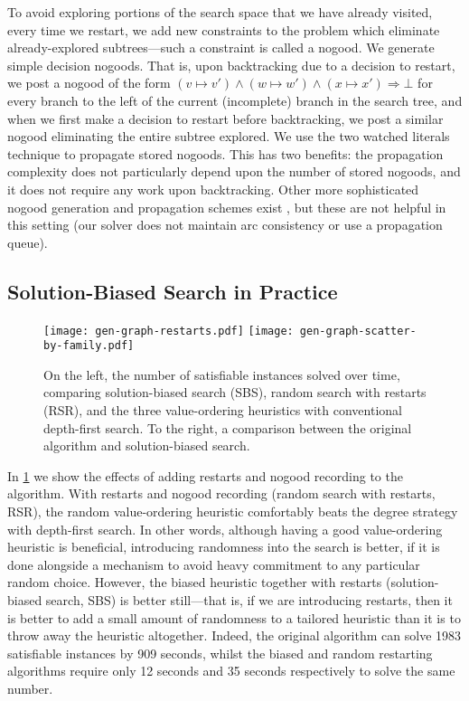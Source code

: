 \documentclass[runningheads]{llncs}
\newcommand{\siplineref}[1]{line~\ref{line:sip:#1}}
\begin{document}
To avoid exploring portions of the search
space that we have already visited, every time we restart, we add new constraints to the problem
which eliminate already-explored subtrees---such a constraint is called a nogood. We generate
simple decision nogoods. That is, upon backtracking due to a decision to restart, we post a nogood
of the form $(v \mapsto v') \wedge (w \mapsto w') \wedge (x \mapsto x') \Rightarrow \bot$ for every
branch to the left of the current (incomplete) branch in the search tree, and when we first make a
decision to restart before backtracking, we post a similar nogood eliminating the entire subtree
explored. We use the two watched literals technique \cite{DBLP:conf/dac/MoskewiczMZZM01} to
propagate stored nogoods.
This has two benefits: the propagation complexity does not particularly depend upon the number of
stored nogoods, and it does not require any work upon backtracking.  Other more sophisticated nogood
generation and propagation schemes exist \cite{DBLP:conf/aaai/LeeSZ16,DBLP:conf/cp/GlorianBLLM17},
but these are not helpful in this setting (our solver does not maintain arc consistency or use a
propagation queue).

\subsection{Solution-Biased Search in Practice}

\begin{figure}[tb]
    \texttt{[image: gen-graph-restarts.pdf]}
    \hfill
    \texttt{[image: gen-graph-scatter-by-family.pdf]}

    \caption{On the left, the number of satisfiable instances solved over time, comparing
    solution-biased search (SBS), random search with restarts (RSR), and the three value-ordering
    heuristics with conventional depth-first search. To the right, a comparison between the original
    algorithm and solution-biased search.}
    \label{figure:old-vs-new}
\end{figure}

In \cref{figure:old-vs-new} we show the effects of adding restarts and nogood recording to the
algorithm. With restarts and nogood recording (random search with restarts, RSR), the random
value-ordering heuristic comfortably beats the degree strategy with depth-first search. In other
words, although having a good value-ordering heuristic is beneficial, introducing randomness into
the search is better, if it is done alongside a mechanism to avoid heavy commitment to any
particular random choice. However, the biased heuristic together
with restarts (solution-biased search, SBS) is better still---that is, if we are introducing
restarts, then it is better to add a small amount of randomness to a tailored heuristic than it is
to throw away the heuristic altogether.  Indeed, the original algorithm can solve 1983 satisfiable
instances by 909 seconds, whilst the biased and random restarting algorithms require only 12 seconds
and 35 seconds respectively to solve the same number.
\end{document}

